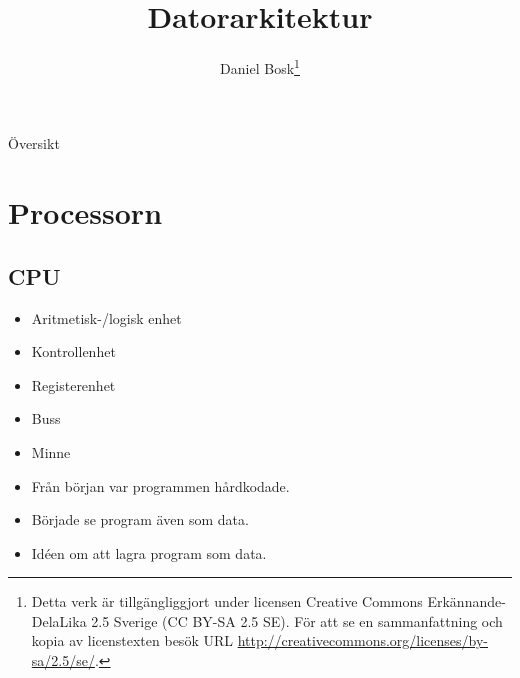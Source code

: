 \documentclass{beamer}
\title{%
  Datorarkitektur
}
\author{Daniel Bosk\footnote{%
  \tiny
  Detta verk är tillgängliggjort under licensen Creative Commons 
  Erkännande-DelaLika 2.5 Sverige (CC BY-SA 2.5 SE).
  För att se en sammanfattning och kopia av licenstexten besök URL 
  \url{http://creativecommons.org/licenses/by-sa/2.5/se/}.
}}
\institute[MIUN IKS]{%
  Avdelningen för informations- och kommunikationssytem (IKS),\\
  Mittuniversitetet, Sundsvall.
}
\date{\svnId}
\theoremstyle{definition}
\theoremstyle{remark}
\begin{document}
\begin{frame}
  \titlepage
\end{frame}

\begin{frame}{Översikt}
  \tableofcontents
\end{frame}

\begin{frame}
  
\end{frame}





\section{Processorn}

\subsection{CPU}

\begin{frame}{\insertsubsectionhead}
  \begin{itemize}
    \item Aritmetisk-/logisk enhet
    \item Kontrollenhet
    \item Registerenhet
  \end{itemize}
  \begin{itemize}
    \item Buss
    \item Minne
  \end{itemize}
\end{frame}

\begin{frame}{\insertsubsectionhead}
  \begin{itemize}
    \item Från början var programmen hårdkodade.
    \item Började se program även som data.
    \item Idéen om att lagra program som data.
  \end{itemize}
\end{frame}
\end{document}
